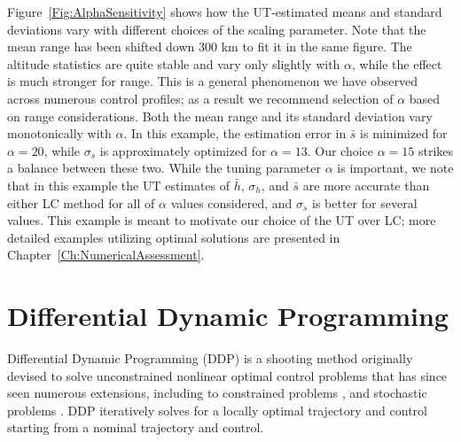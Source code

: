 Figure~\ref{Fig:AlphaSensitivity} shows how the UT-estimated means and standard deviations vary with different choices of the scaling parameter. Note that the mean range has been shifted down 300 km to fit it in the same figure. The altitude statistics are quite stable and vary only slightly with $\alpha$, while the effect is much stronger for range. This is a general phenomenon we have observed across numerous control profiles; as a result we recommend selection of $\alpha$ based on range considerations. 
Both the mean range and its standard deviation vary monotonically with $\alpha$. In this example, the estimation error in $\bar{s}$ is minimized for $\alpha = 20$, while $\sigma_s$ is approximately optimized for $\alpha = 13$. Our choice $\alpha=15$ strikes a balance between these two. 
While the tuning parameter $\alpha$ is important, we note that in this example the UT estimates of $\bar{h},\,\sigma_h$, and $\bar{s}$ are more accurate than either LC method for all of $\alpha$ values considered, and $\sigma_s$ is better for several values.
This example is meant to motivate our choice of the UT over LC; more detailed examples utilizing optimal solutions are presented in Chapter~\ref{Ch:NumericalAssessment}. 

\section{Differential Dynamic Programming}\label{Sec:DDP}
Differential Dynamic Programming (DDP) is a shooting method originally devised to solve unconstrained nonlinear optimal control problems that has since seen numerous extensions, including to constrained problems \cite{DDP_ControlLimited,HDDP1,HDDP2,DDP_NonlinearConstraints,DDP_InteriorPoint}, and stochastic problems \cite{iLQG, DDP_Stochastic, ozaki_UT,ozaki2020tube}. DDP iteratively solves for a locally optimal trajectory and control starting from a nominal trajectory and control.

